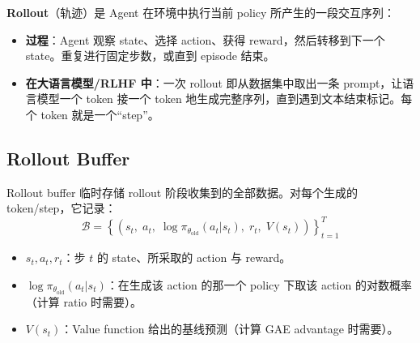 \textbf{Rollout}（轨迹）是 Agent 在环境中执行当前 policy 所产生的一段交互序列：

\begin{itemize}
  \item \textbf{过程}：Agent 观察 state、选择 action、获得 reward，然后转移到下一个 state。重复进行固定步数，或直到 episode 结束。
  \item \textbf{在大语言模型/RLHF 中}：一次 rollout 即从数据集中取出一条 prompt，让语言模型一个 token 接一个 token 地生成完整序列，直到遇到文本结束标记。每个 token 就是一个“step”。
\end{itemize}

\subsection{Rollout Buffer}
\label{the-rollout-buffer}

Rollout buffer 临时存储 rollout 阶段收集到的全部数据。对每个生成的 token/step，它记录：
\begin{equation}
\boxed{\mathcal{B} = \left\{ \left(s_t,\; a_t,\; \log\pi_{\theta_{\text{old}}}(a_t|s_t),\; r_t,\; V(s_t)\right) \right\}_{t=1}^{T}}
\end{equation}

\begin{itemize}
  \item $s_t, a_t, r_t$：步 $t$ 的 state、所采取的 action 与 reward。
  \item $\log\pi_{\theta_{\text{old}}}(a_t|s_t)$：在生成该 action 的那一个 policy 下取该 action 的对数概率（计算 ratio 时需要）。
  \item $V(s_t)$：Value function 给出的基线预测（计算 GAE advantage 时需要）。
\end{itemize}

